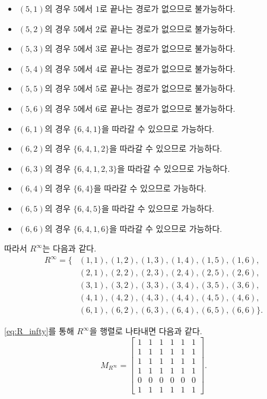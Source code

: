 \documentclass{oblivoir}
\begin{document}
\begin{itemize}
    \item $(5,1)$의 경우 $5$에서 $1$로 끝나는 경로가 없으므로 불가능하다.
    \item $(5,2)$의 경우 $5$에서 $2$로 끝나는 경로가 없으므로 불가능하다.
    \item $(5,3)$의 경우 $5$에서 $3$로 끝나는 경로가 없으므로 불가능하다.
    \item $(5,4)$의 경우 $5$에서 $4$로 끝나는 경로가 없으므로 불가능하다.
    \item $(5,5)$의 경우 $5$에서 $5$로 끝나는 경로가 없으므로 불가능하다.
    \item $(5,6)$의 경우 $5$에서 $6$로 끝나는 경로가 없으므로 불가능하다.
    \item $(6,1)$의 경우 $\{6,4,1\}$을 따라갈 수 있으므로 가능하다.
    \item $(6,2)$의 경우 $\{6,4,1,2\}$을 따라갈 수 있으므로 가능하다.
    \item $(6,3)$의 경우 $\{6,4,1,2,3\}$을 따라갈 수 있으므로 가능하다.
    \item $(6,4)$의 경우 $\{6,4\}$을 따라갈 수 있으므로 가능하다.
    \item $(6,5)$의 경우 $\{6,4,5\}$을 따라갈 수 있으므로 가능하다.
    \item $(6,6)$의 경우 $\{6,4,1,6\}$을 따라갈 수 있으므로 가능하다.
\end{itemize}
따라서 $R^\infty$는 다음과 같다.
\begin{equation}\label{eq:R_infty}
    \begin{aligned}
        R^\infty = \{
            &(1,1), (1,2), (1,3), (1,4), (1,5), (1,6),\\
            &(2,1), (2,2), (2,3), (2,4), (2,5), (2,6),\\
            &(3,1), (3,2), (3,3), (3,4), (3,5), (3,6),\\
            &(4,1), (4,2), (4,3), (4,4), (4,5), (4,6),\\
            &(6,1), (6,2), (6,3), (6,4), (6,5), (6,6)\}.
    \end{aligned}
\end{equation}

\eqref{eq:R_infty}를 통해 $R^\infty$을 행렬로 나타내면 다음과 같다.
\begin{equation}
    M_{R^\infty} = \begin{bmatrix}
        1 & 1 & 1 & 1 & 1 & 1\\
        1 & 1 & 1 & 1 & 1 & 1\\
        1 & 1 & 1 & 1 & 1 & 1\\
        1 & 1 & 1 & 1 & 1 & 1\\
        0 & 0 & 0 & 0 & 0 & 0\\
        1 & 1 & 1 & 1 & 1 & 1
    \end{bmatrix}.
\end{equation}
\end{document}
